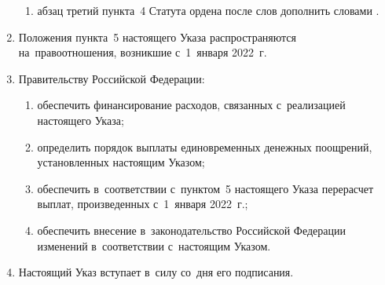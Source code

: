 \documentclass{../president-decree}
\providecommand*{\asbuk}{}
\begin{document}
\begin{enumerate}
\begin{enumerate}[label=\asbuk*), ref=\asbuk*]
			\item абзац третий пункта~4 Статута ордена  после слов  дополнить словами .
		\end{enumerate}
	
		\item Положения пункта~5 настоящего Указа распространяются на~правоотношения, возникшие с~1~января 2022~г.
		
		\item Правительству Российской Федерации:
		\begin{enumerate}[label=\asbuk*), ref=\asbuk*]
			\item обеспечить финансирование расходов, связанных с~реализацией настоящего Указа;
			
			\item определить порядок выплаты единовременных денежных поощрений, установленных настоящим Указом;
			
			\item обеспечить в~соответствии с~пунктом~5 настоящего Указа перерасчет выплат, произведенных с~1~января 2022~г.;
			
			\item обеспечить внесение в~законодательство Российской Федерации изменений в~соответствии с~настоящим Указом.
		\end{enumerate}
	
		\item Настоящий Указ вступает в~силу со~дня его подписания.
	\end{enumerate}
\end{document}
